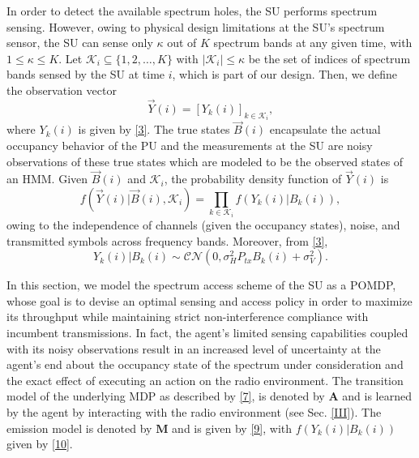 \documentclass[10pt,twocolumn]{IEEEtran}
\begin{document}
In order to detect the available spectrum holes, the SU performs spectrum sensing. However, owing to physical design limitations at the SU's spectrum sensor, the SU can sense only $\kappa$ out of $K$ spectrum bands at any given time, with $1{\leq}\kappa{\leq}K$. Let $\mathcal K_{i}{\subseteq}\{1,2,\dots,K\}$ with $|\mathcal K_i|{\leq}\kappa$ be the set of indices of spectrum bands sensed by the SU at time $i$, which is part of our design.
Then, we define the observation vector
\begin{equation}\label{8}
    \vec{Y}(i) = [Y_k(i)]_{k {\in} \mathcal K_i},
\end{equation}
where $Y_k(i)$ is given by \eqref{3}.
The true states $\vec{B}(i)$ encapsulate the actual occupancy behavior of the PU and the measurements at the SU are noisy observations of these true states which are modeled to be the observed states of an HMM. Given $\vec{B}(i)$ and $\mathcal K_i$, the probability density function of $\vec{Y}(i)$ is
\begin{equation}\label{9}
    f(\vec{Y}(i)|\vec{B}(i), \mathcal K_i) = \prod_{k \in \mathcal K_i} f(Y_k(i)|B_k(i)),
\end{equation}
owing to the independence of channels (given the occupancy states), noise, and transmitted symbols across frequency bands. Moreover, from \eqref{3},
\begin{equation}\label{10}
 Y_k(i)|B_k(i) \sim \mathcal{CN}(0, \sigma_H^2P_{tx}B_k(i) + \sigma_V^2).
\end{equation}

In this section, we model the spectrum access scheme of the SU as a POMDP, whose goal is to devise an optimal sensing and access policy in order to maximize its throughput while maintaining strict non-interference compliance with incumbent transmissions. In fact, the agent's limited sensing capabilities coupled with its noisy observations result in an increased level of uncertainty at the agent's end about the occupancy state of the spectrum under consideration and the exact effect of executing an action on the radio environment. The transition model of the underlying MDP as described by \eqref{7}, is denoted by $\mathbf{A}$ and is learned by the agent by interacting with the radio environment (see Sec. \ref{III}). The emission model is denoted by $\mathbf{M}$ and is given by \eqref{9}, with $f(Y_k(i)|B_k(i))$ given by \eqref{10}. 
\end{document}
